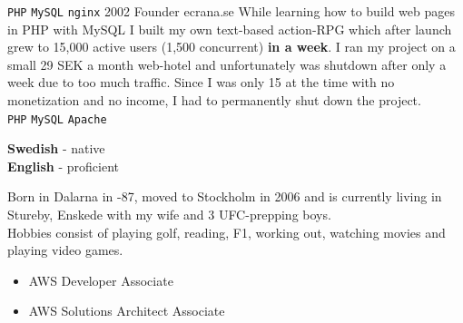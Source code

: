 \documentclass[9pt]{template} %
\begin{document}
\begin{entrylist}
{      \texttt{PHP}\slashsep
      \texttt{MySQL}\slashsep
      \texttt{nginx}
    }
  \entry
    {2002}
    {Founder}
    {ecrana.se}
    {While learning how to build web pages in PHP with MySQL I built my own text-based action-RPG which after launch grew to 15,000 active users (1,500 concurrent) \textbf{in a week}. I ran my project on a small 29 SEK a month web-hotel and unfortunately was shutdown after only a week due to too much traffic. Since I was only 15 at the time with no monetization and no income, I had to permanently shut down the project.\\
      \texttt{PHP}\slashsep
      \texttt{MySQL}\slashsep
      \texttt{Apache}
    }
\end{entrylist}

\pagebreak


\begin{minipage}[t]{0.20\textwidth}
  \vspace{-\baselineskip} %


  \textbf{Swedish} - native\\
  \textbf{English} - proficient
\end{minipage}
\hfill
\begin{minipage}[t]{0.46\textwidth}
  \vspace{-\baselineskip} %


  Born in Dalarna in -87, moved to Stockholm in 2006 and is currently living in Stureby, Enskede with my wife and 3 UFC-prepping boys.\\

  Hobbies consist of playing golf, reading, F1, working out, watching movies and playing video games.
\end{minipage}
\hfill
\begin{minipage}[t]{0.30\textwidth}
  \vspace{-\baselineskip} %


  \vspace{-3mm}
  \begin{itemize}[leftmargin=12pt]
    \setlength{\parskip}{0pt}
    \setlength{\itemsep}{0pt plus 1pt}
    \item AWS Developer {\footnotesize{Associate}}
    \item AWS Solutions Architect {\footnotesize{Associate}}
  \end{itemize}
\end{minipage}
\end{document}

